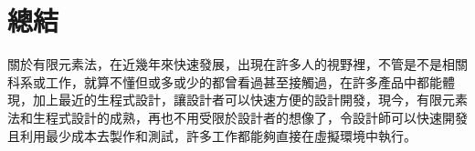 \chapter{總結}
關於有限元素法，在近幾年來快速發展，出現在許多人的視野裡，不管是不是相關科系或工作，就算不懂但或多或少的都曾看過甚至接觸過，在許多產品中都能體現，加上最近的生程式設計，讓設計者可以快速方便的設計開發，現今，有限元素法和生程式設計的成熟，再也不用受限於設計者的想像了，令設計師可以快速開發且利用最少成本去製作和測試，許多工作都能夠直接在虛擬環境中執行。
\newpage
